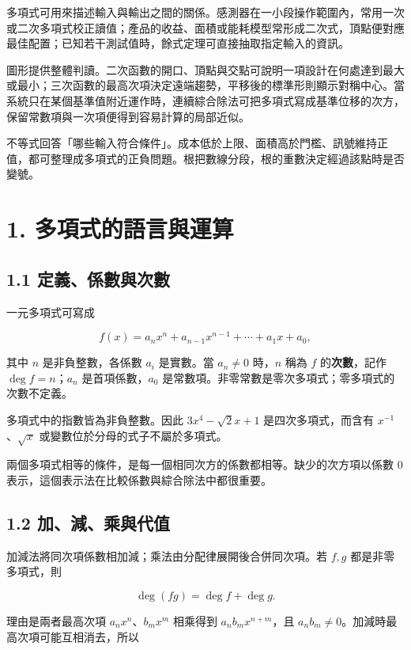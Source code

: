 \documentclass[11pt,a4paper]{article}
\begin{document}
多項式可用來描述輸入與輸出之間的關係。感測器在一小段操作範圍內，常用一次或二次多項式校正讀值；產品的收益、面積或能耗模型常形成二次式，頂點便對應最佳配置；已知若干測試值時，餘式定理可直接抽取指定輸入的資訊。

圖形提供整體判讀。二次函數的開口、頂點與交點可說明一項設計在何處達到最大或最小；三次函數的最高次項決定遠端趨勢，平移後的標準形則顯示對稱中心。當系統只在某個基準值附近運作時，連續綜合除法可把多項式寫成基準位移的次方，保留常數項與一次項便得到容易計算的局部近似。

不等式回答「哪些輸入符合條件」。成本低於上限、面積高於門檻、訊號維持正值，都可整理成多項式的正負問題。根把數線分段，根的重數決定經過該點時是否變號。

\section{1. 多項式的語言與運算}\label{ux591aux9805ux5f0fux7684ux8a9eux8a00ux8207ux904bux7b97}

\subsection{1.1 定義、係數與次數}\label{ux5b9aux7fa9ux4fc2ux6578ux8207ux6b21ux6578}

一元多項式可寫成

\[
f(x)=a_nx^n+a_{n-1}x^{n-1}+\cdots+a_1x+a_0,
\]

其中 \(n\) 是非負整數，各係數 \(a_i\) 是實數。當 \(a_n\ne0\) 時，\(n\) 稱為 \(f\) 的\textbf{次數}，記作 \(\deg f=n\)；\(a_n\) 是首項係數，\(a_0\) 是常數項。非零常數是零次多項式；零多項式的次數不定義。

多項式中的指數皆為非負整數。因此 \(3x^4-\sqrt2x+1\) 是四次多項式，而含有 \(x^{-1}\)、\(\sqrt{x}\) 或變數位於分母的式子不屬於多項式。

兩個多項式相等的條件，是每一個相同次方的係數都相等。缺少的次方項以係數 \(0\) 表示，這個表示法在比較係數與綜合除法中都很重要。

\subsection{1.2 加、減、乘與代值}\label{ux52a0ux6e1bux4e58ux8207ux4ee3ux503c}

加減法將同次項係數相加減；乘法由分配律展開後合併同次項。若 \(f,g\) 都是非零多項式，則

\[
\deg(fg)=\deg f+\deg g.
\]

理由是兩者最高次項 \(a_nx^n\)、\(b_mx^m\) 相乘得到 \(a_nb_mx^{n+m}\)，且 \(a_nb_m\ne0\)。加減時最高次項可能互相消去，所以
\end{document}
